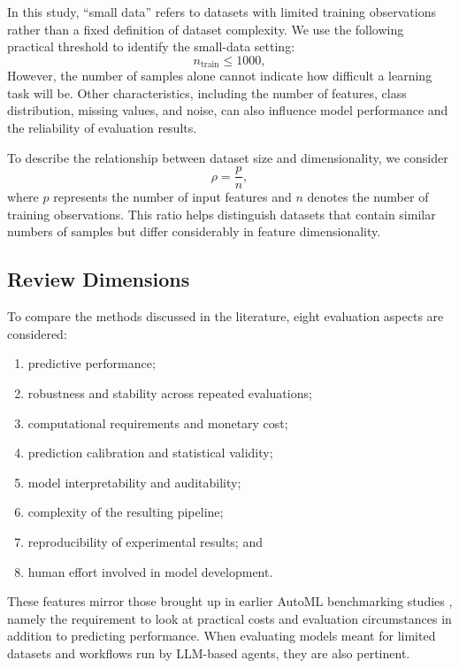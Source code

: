 \documentclass[acmsmall,screen]{acmart}
\begin{document}
In this study, ``small data'' refers to datasets with limited training observations rather than a fixed definition of dataset complexity. We use the following practical threshold to identify the small-data setting:
\begin{equation}
n_{\mathrm{train}}\leq 1000,
\label{eq:small}
\end{equation}
However, the number of samples alone cannot indicate how difficult a learning task will be. Other characteristics, including the number of features, class distribution, missing values, and noise, can also influence model performance and the reliability of evaluation results.

To describe the relationship between dataset size and dimensionality, we consider
\begin{equation}
\rho=\frac{p}{n},
\label{eq:rho}
\end{equation}
where $p$ represents the number of input features and $n$ denotes the number of training observations. This ratio helps distinguish datasets that contain similar numbers of samples but differ considerably in feature dimensionality.

\subsection{Review Dimensions}

To compare the methods discussed in the literature, eight evaluation aspects are considered:

\begin{enumerate}[leftmargin=*]
\item predictive performance;
\item robustness and stability across repeated evaluations;
\item computational requirements and monetary cost;
\item prediction calibration and statistical validity;
\item model interpretability and auditability;
\item complexity of the resulting pipeline;
\item reproducibility of experimental results; and
\item human effort involved in model development.
\end{enumerate}

These features mirror those brought up in earlier AutoML benchmarking studies \cite{gijsbers2024}, namely the requirement to look at practical costs and evaluation circumstances in addition to predicting performance. When evaluating models meant for limited datasets and workflows run by LLM-based agents, they are also pertinent.
\end{document}
